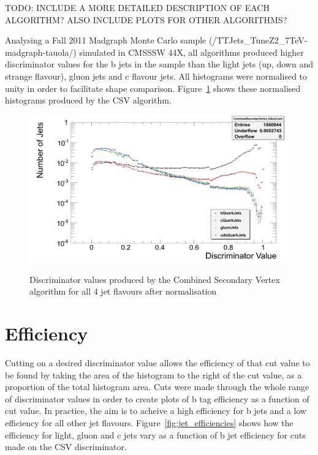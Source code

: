 TODO: INCLUDE A MORE DETAILED DESCRIPTION OF EACH ALGORITHM? ALSO INCLUDE PLOTS FOR OTHER ALGORITHMS?

Analysing a Fall 2011 \ttbar Madgraph Monte Carlo sample (/TTJets\_TuneZ2\_7TeV-madgraph-tauola/) simulated in
CMSSSW 44X, all algorithms produced higher discriminator values for the b jets in the sample than the light
jets (up, down and strange flavour), gluon jets and c flavour jets. All histograms were normalised to unity in
order to facilitate shape comparison. Figure~\ref{fig:CSV_discriminators} shows these normalised histograms
produced by the CSV algorithm.

\begin{figure}[hbtp]
   \centering
     \includegraphics[width=\textwidth]{Chapters/04_Analysis/04a_BTags/Images/CombinedSecondaryVertex_discriminator_combined}\\
     \caption{Discriminator values produced by the Combined Secondary Vertex algorithm for all 4 jet flavours after normalisation}
     \label{fig:CSV_discriminators}
\end{figure}

\section{Efficiency}
\label{s:efficiency}

Cutting on a desired discriminator value allows the efficiency of that cut value to be found by taking the
area of the histogram to the right of the cut value, as a proportion of the total histogram area. Cuts were
made through the whole range of discriminator values in order to create plots of b tag efficiency as a
function of cut value. In practice, the aim is to acheive a high efficiency for b jets and a low efficiency
for all other jet flavours. Figure~\ref{fig:jet_efficiencies} shows how the efficiency for light, gluon and c
jets vary as a function of b jet efficiency for cuts made on the CSV discriminator.

